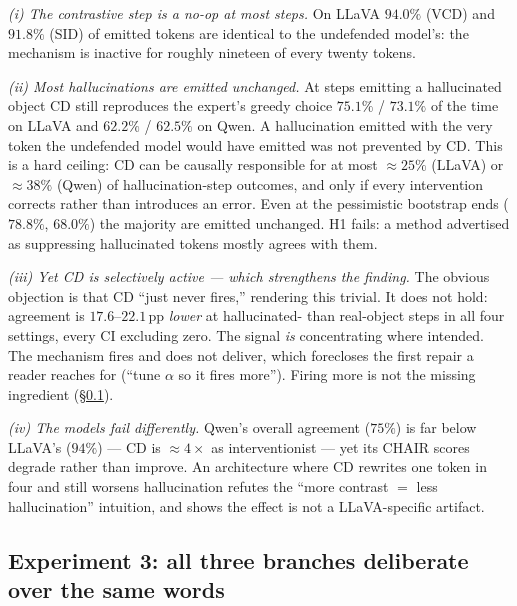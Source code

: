 \emph{(i) The contrastive step is a no-op at most steps.} On LLaVA $94.0\%$
(VCD) and $91.8\%$ (SID) of emitted tokens are identical to the undefended
model's: the mechanism is inactive for roughly nineteen of every twenty tokens.

\emph{(ii) Most hallucinations are emitted unchanged.} At steps emitting a
hallucinated object CD still reproduces the expert's greedy choice $75.1\%$ /
$73.1\%$ of the time on LLaVA and $62.2\%$ / $62.5\%$ on Qwen. A hallucination
emitted with the very token the undefended model would have emitted was not
prevented by CD. This is a hard ceiling: CD can be causally responsible for at
most ${\approx}25\%$ (LLaVA) or ${\approx}38\%$ (Qwen) of hallucination-step
outcomes, and only if every intervention corrects rather than introduces an
error. Even at the pessimistic bootstrap ends ($78.8\%$, $68.0\%$) the majority
are emitted unchanged. H1 fails: a method advertised as suppressing
hallucinated tokens mostly agrees with them.

\emph{(iii) Yet CD is selectively active --- which strengthens the finding.} The
obvious objection is that CD ``just never fires,'' rendering this trivial. It
does not hold: agreement is $17.6$--$22.1$\,pp \emph{lower} at hallucinated-
than real-object steps in all four settings, every CI excluding zero. The
signal \emph{is} concentrating where intended. The mechanism fires and does not
deliver, which forecloses the first repair a reader reaches for (``tune
$\alpha$ so it fires more''). Firing more is not the missing ingredient
(\S\ref{subsec:cdmech-res-overlap}).

\emph{(iv) The models fail differently.} Qwen's overall agreement ($75\%$) is
far below LLaVA's ($94\%$) --- CD is ${\approx}4\times$ as interventionist ---
yet its CHAIR scores degrade rather than improve. An architecture where CD
rewrites one token in four and still worsens hallucination refutes the ``more
contrast $=$ less hallucination'' intuition, and shows the effect is not a
LLaVA-specific artifact.

\subsection{Experiment 3: all three branches deliberate over the same words}
\label{subsec:cdmech-res-overlap}

